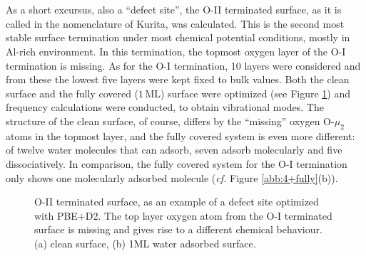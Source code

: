 \documentclass[11pt,DIV=13,BCOR=5mm,a4paper,headinclude]{scrbook}
\begin{document}
\\
\\
As a short excursus, also a ``defect site'', the O-II terminated surface, as it is called in the nomenclature of Kurita\cite{kuri10}, was calculated.
This is the second most stable surface termination under most chemical potential conditions, mostly in Al-rich environment.
In this termination, the topmost oxygen layer of the O-I termination is missing.
As for the O-I termination, 10 layers were considered and from these the lowest five layers were kept fixed to bulk values.
Both the clean surface and the fully covered ($1\,$ML) surface were optimized (see Figure \ref{abb:O-II-geom}) and frequency calculations were conducted, to obtain vibrational modes.
The structure of the clean surface, of course, differs by the ``missing'' oxygen O-$\mu_2$ atoms in the topmost layer, and the fully covered system is even more different: of twelve water molecules that can adsorb, seven adsorb molecularly and five dissociatively.
In comparison, the fully covered system for the O-I termination only shows one molecularly adsorbed molecule (\textit{cf.} Figure \ref{abb:4+fully}(b)).
 \begin{figure}[!ht]
 \centering
{}
 \quad\quad
 \caption{O-II terminated surface, as an example of a defect site optimized with PBE+D2.
The top layer oxygen atom from the O-I terminated surface is missing and gives rise to a different chemical behaviour.
(a) clean surface, (b) 1ML water adsorbed surface.}
        \label{abb:O-II-geom}
 \end{figure}
\end{document}
